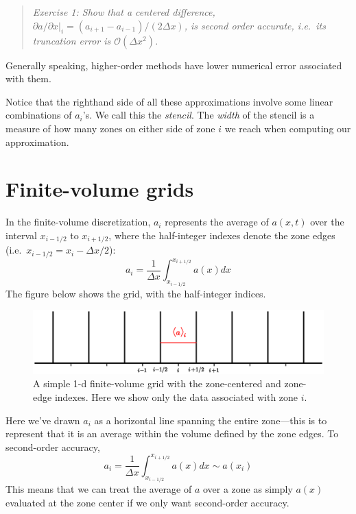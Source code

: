 \begin{quote}
{\em Exercise 1: Show that a centered difference, ${\partial a}/
  {\partial x} |_i = ({a_{i+1} - a_{i-1}})/({2 \Delta x})$, is second order
accurate, i.e.\ its truncation error is $\mathcal{O}(\Delta x^2)$.}
\end{quote}

Generally speaking, higher-order methods have lower numerical error
associated with them.

Notice that the righthand side of all these approximations involve
some linear combinations of $a_i$'s.  We call this the {\em stencil}.
The {\em width} of the stencil is a measure of how many zones on
either side of zone $i$ we reach when computing our approximation.

\section{Finite-volume grids}

In the finite-volume discretization, $a_i$ represents the average of
$a(x,t)$ over the interval $x_{i-1/2}$ to $x_{i+1/2}$, where the
half-integer indexes denote the zone edges (i.e.\ $x_{i-1/2} = x_i -
\Delta x/2$):
\begin{equation}
\label{eq:fv_cc-a}
a_i = \frac{1}{\Delta x} \int_{x_{i-1/2}}^{x_{i+1/2}} a(x) dx 
\end{equation}
The figure below shows the grid, with the half-integer indices.
\begin{figure}[h]
\centering
\includegraphics[width=6.0in]{simplegrid2}
\caption{A simple 1-d finite-volume grid with the zone-centered and
  zone-edge indexes.  Here we show only the data associated with zone $i$.}
\end{figure}
%
Here we've drawn $a_i$ as a horizontal line spanning the entire zone---this 
is to represent that it is an average within the volume defined by the zone
edges.
%
To second-order accuracy,
\begin{equation}
\label{eq:fv_cc}
a_i = \frac{1}{\Delta x} \int_{x_{i-1/2}}^{x_{i+1/2}} a(x) dx \sim a(x_i) 
\end{equation}
This means that we can treat the average of $a$ over a zone as simply $a(x)$
evaluated at the zone center if we only want second-order accuracy.

